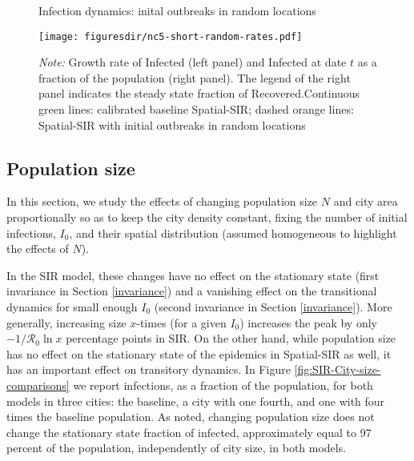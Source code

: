 \documentclass[english,11pt]{article}
\newcommand{\notegrowth}{\emph{Note:} Growth rate of Infected (left panel) and Infected at date $t$ as a fraction of the population (right panel). }
\newcommand{\notelegend}{The legend of the right panel indicates the steady state fraction of Recovered.}
\begin{document}
\begin{figure}[t]
    \caption{Infection dynamics: inital outbreaks in random locations}\label{fig:cluster-rates}
    \centering
    \texttt{[image: figuresdir/nc5-short-random-rates.pdf]}
    \caption*{\normalfont\footnotesize 
    \notegrowth \notelegend Continuous green lines: calibrated baseline Spatial-SIR; dashed orange lines: Spatial-SIR with initial outbreaks in random locations}
\end{figure}




\subsection{Population size} 

In this section, we study the effects of changing population size $N$ and city area proportionally so as to keep the city
density constant, fixing the number of initial infections, $I_0$, and their spatial distribution (assumed homogeneous to highlight the effects of $N$). 

In the SIR model, these changes have no effect on the stationary state (first invariance in Section \ref{invariance}) and a vanishing effect on the transitional dynamics for small enough $I_0$ (second invariance in Section \ref{invariance}).  More generally, increasing size $x$-times  (for a given $I_0$)  increases the peak by only  $-1/ \mathcal{R}_0 \ln x$  percentage points in SIR.   
On the other hand, while population size has no effect on the stationary state of the epidemics in Spatial-SIR as well, it has an important effect on transitory dynamics. 
In Figure \ref{fig:SIR-City-size-comparisons}   we 
report infections, as a fraction of the population, for both models in three cities: the baseline, a city with one fourth, and one with four times the baseline population.  As noted, changing population size does not change the stationary state fraction of infected, approximately equal to
97 percent of the population, independently of city size, in both models. 
\end{document}
